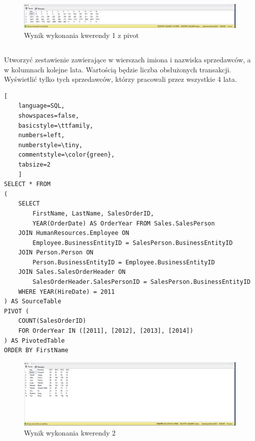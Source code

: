 \documentclass[a4paper,12pt]{article}
\begin{document}
\begin{figure}[H]
    \centering
    \includegraphics[width=1.0\textwidth]{images/01_pivot.png}
    \caption{Wynik wykonania kwerendy 1 z pivot}
    \label{fig:1_pivot}
\end{figure}

\subsection{}

Utworzyć zestawienie zawierające w wierszach imiona i nazwiska sprzedawców, a w kolumnach kolejne lata. Wartością będzie liczba obsłużonych transakcji. Wyświetlić tylko tych sprzedawców, którzy pracowali przez wszystkie 4 lata.

\begin{lstlisting}[
    language=SQL,
    showspaces=false,
    basicstyle=\ttfamily,
    numbers=left,
    numberstyle=\tiny,
    commentstyle=\color{green},
    tabsize=2
    ]
SELECT * FROM
(
	SELECT 
        FirstName, LastName, SalesOrderID, 
        YEAR(OrderDate) AS OrderYear FROM Sales.SalesPerson
	JOIN HumanResources.Employee ON 
        Employee.BusinessEntityID = SalesPerson.BusinessEntityID
	JOIN Person.Person ON 
        Person.BusinessEntityID = Employee.BusinessEntityID
	JOIN Sales.SalesOrderHeader ON 
        SalesOrderHeader.SalesPersonID = SalesPerson.BusinessEntityID
	WHERE YEAR(HireDate) = 2011
) AS SourceTable
PIVOT (
	COUNT(SalesOrderID)
	FOR OrderYear IN ([2011], [2012], [2013], [2014])
) AS PivotedTable
ORDER BY FirstName
\end{lstlisting}

\begin{figure}[H]
    \centering
    \includegraphics[width=1.0\textwidth]{images/02.png}
    \caption{Wynik wykonania kwerendy 2}
\end{figure}

\subsection{}
\end{document}
